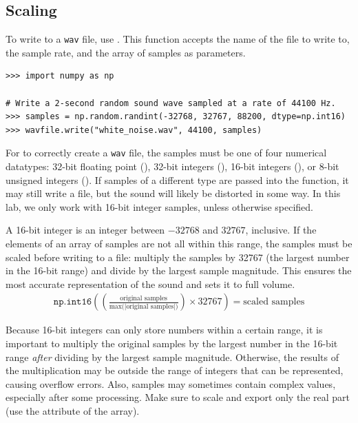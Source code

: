 \subsection*{Scaling} %

To write to a \texttt{wav} file, use .
This function accepts the name of the file to write to, the sample rate, and the array of samples as parameters.

\begin{lstlisting}
>>> import numpy as np

# Write a 2-second random sound wave sampled at a rate of 44100 Hz.
>>> samples = np.random.randint(-32768, 32767, 88200, dtype=np.int16)
>>> wavfile.write("white_noise.wav", 44100, samples)
\end{lstlisting}

For  to correctly create a \texttt{wav} file, the samples must be one of four numerical datatypes: 32-bit floating point (), 32-bit integers (), 16-bit integers (), or 8-bit unsigned integers ().
If samples of a different type are passed into the function, it may still write a file, but the sound will likely be distorted in some way.
In this lab, we only work with 16-bit integer samples, unless otherwise specified.

A 16-bit integer is an integer between $-32768$ and $32767$, inclusive.
If the elements of an array of samples are not all within this range, the samples must be scaled before writing to a file: multiply the samples by 32767 (the largest number in the 16-bit range) and divide by the largest sample magnitude.
This ensures the most accurate representation of the sound and sets it to full volume.
\begin{align}
\label{eq:dft-scale-samples}
\texttt{np.int16}\left(\left(\frac{\mbox{original samples}}{\mbox{$\max$(|original samples|)}}\right) \times 32767\right) =\mbox{scaled samples}
\end{align}

Because 16-bit integers can only store numbers within a certain range, it is important to multiply the original samples by the largest number in the 16-bit range \emph{after} dividing by the largest sample magnitude.
Otherwise, the results of the multiplication may be outside the range of integers that can be represented, causing overflow errors.
Also, samples may sometimes contain complex values, especially after some processing.
Make sure to scale and export only the real part (use the  attribute of the array).

